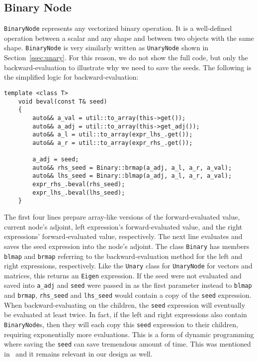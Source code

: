 \subsection{Binary Node}\label{ssec:binary}

\verb|BinaryNode| represents any vectorized binary operation.
It is a well-defined operation between a scalar and any shape 
and between two objects with the same shape.
\verb|BinaryNode| is very similarly written as \verb|UnaryNode| shown in Section~\ref{ssec:unary}.
For this reason, we do not show the full code,
but only the backward-evaluation to illustrate why we need to save the seeds.
The following is the simplified logic for backward-evaluation:
\begin{lstlisting}[style=customcpp]
    template <class T>
    void beval(const T& seed)
    {
        auto&& a_val = util::to_array(this->get());
        auto&& a_adj = util::to_array(this->get_adj());
        auto&& a_l = util::to_array(expr_lhs_.get());
        auto&& a_r = util::to_array(expr_rhs_.get());

        a_adj = seed;
        auto&& rhs_seed = Binary::brmap(a_adj, a_l, a_r, a_val);
        auto&& lhs_seed = Binary::blmap(a_adj, a_l, a_r, a_val);
        expr_rhs_.beval(rhs_seed);
        expr_lhs_.beval(lhs_seed);
    }
\end{lstlisting}
The first four lines prepare array-like versions of the 
forward-evaluated value, current node's adjoint,
left expression's forward-evaluated value,
and the right expressions' forward-evaluated value, respectively.
The next line evaluates and saves the seed expression into the node's adjoint.
The class \verb|Binary| has members \verb|blmap| and \verb|brmap|
referring to the backward-evaluation method for the left and right expressions, respectively.
Like the \verb|Unary| class for \verb|UnaryNode| for vectors and matrices,
this returns an \verb|Eigen| expression.
If the seed were not evaluated and saved into \verb|a_adj|
and \verb|seed| were passed in as the first parameter instead to \verb|blmap| and \verb|brmap|,
\verb|rhs_seed| and \verb|lhs_seed| would contain a copy of the \verb|seed| expression.
When backward-evaluating on the children,
the \verb|seed| expression will eventually be evaluated at least twice.
In fact, if the left and right expressions also contain \verb|BinaryNode|s,
then they will each copy this \verb|seed| expression to their children,
requiring exponentially more evaluations.
This is a form of dynamic programming where saving the \verb|seed| can save tremendous amount of time.
This was mentioned in~\cite{carpenter:2015} and it remains relevant in our design as well.
